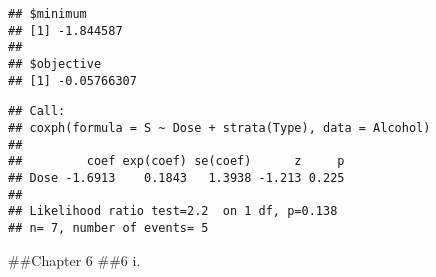 \documentclass[
]{article}
\newenvironment{Shaded}{\begin{snugshade}}{\end{snugshade}}
\newcommand{\AttributeTok}[1]{\textcolor[rgb]{0.77,0.63,0.00}{#1}}
\newcommand{\DecValTok}[1]{\textcolor[rgb]{0.00,0.00,0.81}{#1}}
\newcommand{\FloatTok}[1]{\textcolor[rgb]{0.00,0.00,0.81}{#1}}
\newcommand{\FunctionTok}[1]{\textcolor[rgb]{0.00,0.00,0.00}{#1}}
\newcommand{\NormalTok}[1]{#1}
\newcommand{\OtherTok}[1]{\textcolor[rgb]{0.56,0.35,0.01}{#1}}
\newcommand{\SpecialCharTok}[1]{\textcolor[rgb]{0.00,0.00,0.00}{#1}}
\begin{document}
\begin{verbatim}
## $minimum
## [1] -1.844587
## 
## $objective
## [1] -0.05766307
\end{verbatim}

\begin{Shaded}
\end{Shaded}

\begin{verbatim}
## Call:
## coxph(formula = S ~ Dose + strata(Type), data = Alcohol)
## 
##         coef exp(coef) se(coef)      z     p
## Dose -1.6913    0.1843   1.3938 -1.213 0.225
## 
## Likelihood ratio test=2.2  on 1 df, p=0.138
## n= 7, number of events= 5
\end{verbatim}

\#\#Chapter 6 \#\#6 i.
\end{document}

